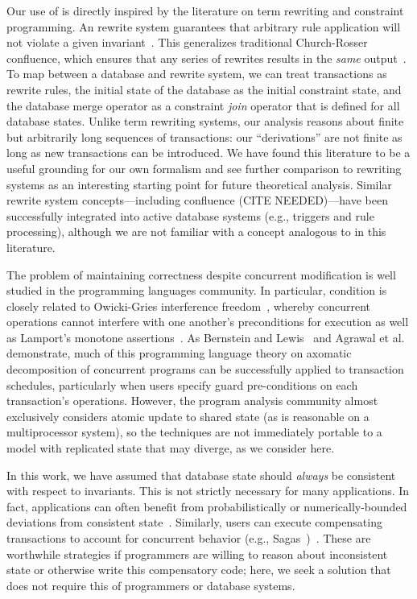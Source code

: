  Our use of \iconfluence is directly inspired
by the literature on term rewriting and constraint programming. An
\iconfluent rewrite system guarantees that arbitrary rule application
will not violate a given invariant~\cite{obs-confluence}. This
generalizes traditional Church-Rosser confluence, which ensures that
any series of rewrites results in the \textit{same}
output~\cite{termrewriting}. To map between a database and rewrite
system, we can treat transactions as rewrite rules, the initial state
of the database as the initial constraint state, and the database
merge operator as a constraint \textit{join} operator that is defined
for all database states. Unlike term rewriting systems, our \cfreedom
analysis reasons about finite but arbitrarily long sequences of
transactions: our ``derivations'' are not finite as long as new
transactions can be introduced. We have found this literature to be a
useful grounding for our own formalism and see further comparison to
rewriting systems as an interesting starting point for future
theoretical analysis. Similar rewrite system concepts---including
confluence (CITE NEEDED)---have been successfully integrated into
active database systems (e.g., triggers and rule processing), although
we are not familiar with a concept analogous to \iconfluence in this
literature.

 The problem of maintaining correctness
despite concurrent modification is well studied in the programming
languages community. In particular, \iconfluence condition is closely
related to Owicki-Gries interference
  freedom~\cite{owickigries}, whereby concurrent operations cannot
interfere with one another's preconditions for execution as well as
Lamport's monotone assertions~\cite{lamport-safety}. As
Bernstein and Lewis~\cite{decomp-semantics} and Agrawal et
al.~\cite{agarwal-consistency} demonstrate, much of this programming
language theory on axomatic decomposition of concurrent programs can
be successfully applied to transaction schedules, particularly when
users specify guard pre-conditions on each transaction's
operations. However, the program analysis community almost exclusively
considers atomic update to shared state (as is reasonable on a
multiprocessor system), so the techniques are not immediately portable
to a model with replicated state that may diverge, as we consider
here.

 In this work, we have assumed that
database state should \textit{always} be consistent with respect to
invariants. This is not strictly necessary for many applications. In
fact, applications can often benefit from probabilistically or
numerically-bounded deviations from consistent
state~\cite{epsilon-divergence}. Similarly, users can execute
compensating transactions to account for concurrent behavior (e.g.,
Sagas~\cite{sagas})~\cite{ic-survey,ic-survey-two}. These are worthwhile
strategies if programmers are willing to reason about inconsistent
state or otherwise write this compensatory code; here,
we seek a solution that does not require this of programmers or
database systems.

